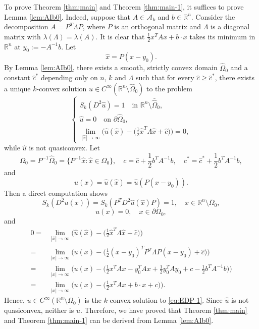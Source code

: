 \documentclass[reqno]{amsart}
\theoremstyle{remark}
\theoremstyle{definition}
\numberwithin{equation}{section}
\begin{document}
To prove Theorem \ref{thm:main} and Theorem \ref{thm:main-1}, it suffices to prove Lemma \ref{lem:AIb0}. Indeed, suppose that $A\in\mathcal{A}_k$ and $b\in\mathbb{R}^n$. Consider the decomposition $A=P^T\Lambda P$, where $P$ is an orthogonal matrix and $\Lambda$ is a diagonal matrix with $\lambda(\Lambda)=\lambda(A)$. It is clear that $\frac{1}{2}x^TAx+b\cdot x$ takes its minimum in $\mathbb{R}^n$ at $y_0:=-A^{-1}b$. Let
\[\hat{x}=P(x-y_0).\]
By Lemma \ref{lem:AIb0}, there exists a smooth, strictly convex domain $\hat{\Omega}_0$ and a constant $\hat{c}^*$ depending only on $n$, $k$ and $\Lambda$ such that for every $\hat{c}\geq\hat{c}^*$, there exists a unique $k$-convex solution $\hat{u}\in C^\infty(\mathbb{R}^n\setminus\hat{\Omega}_0)$ to the problem 
\begin{equation*}
	\begin{cases}
		S_k(D^2\hat{u})=1  \quad\text{in }\mathbb{R}^n\setminus\bar{\hat{\Omega}}_0, \\
		\hat{u}=0  \quad\text{on }\partial\hat{\Omega}_0, \\
		\lim\limits_{|\hat{x}|\to\infty} \big(\hat{u}(\hat{x})-\big(\frac{1}{2}\hat{x}^T\Lambda \hat{x}+\hat{c}\big)\big)=0,
	    \end{cases}
\end{equation*}
while $\hat{u}$ is not quasiconvex. 
Let
\[\Omega_0=P^{-1}\hat{\Omega}_0=\{P^{-1}\hat{x}: \hat{x}\in\hat{\Omega}_0\},\quad c=\hat{c}+\frac{1}{2}b^TA^{-1}b,\quad c^*=\hat{c}^*+\frac{1}{2}b^TA^{-1}b,\]
and
\[u(x)=\hat{u}(\hat x)=\hat{u}(P(x-y_0)).\]
Then a direct computation shows 
$$S_k(D^2u(x))=S_k(P^TD^2\hat{u}(\hat{x})P)=1,\quad x\in \mathbb{R}^n\setminus\bar{\Omega}_0,$$ 
$$u(x)=0,\quad x\in\partial\Omega_0,$$ 
and
\[
\begin{split}
	0= & \lim_{|\hat{x}|\to\infty}\bigg(\hat{u}(\hat{x})-\bigg(\frac{1}{2}\hat{x}^T\Lambda\hat{x}+\hat{c}\bigg)\bigg) \\
	= & \lim_{|x|\to\infty}\bigg(u(x)-\bigg(\frac{1}{2}(x-y_0)^TP^T\Lambda P(x-y_0)+\hat{c}\bigg)\bigg)\\ 
	= & \lim_{|x|\to\infty}\bigg(u(x)-\bigg(\frac{1}{2}x^TAx-y_0^TAx+\frac{1}{2}y_0^TAy_0+c-\frac{1}{2}b^TA^{-1}b\bigg)\bigg) \\
	= & \lim_{|x|\to\infty}\bigg(u(x)-\bigg(\frac{1}{2}x^TAx+b\cdot x+c\bigg)\bigg).
  \end{split}
\]
Hence, $u\in C^\infty(\mathbb{R}^n\setminus\Omega_0)$ is the $k$-convex solution to \eqref{eq:EDP-1}. Since $\hat{u}$ is not quasiconvex, neither is $u$. Therefore, we have proved that Theorem \ref{thm:main} and Theorem \ref{thm:main-1} can be derived from Lemma \ref{lem:AIb0}.
\end{document}
